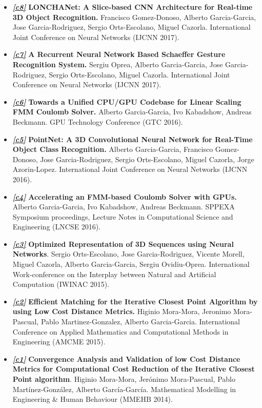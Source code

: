 \documentclass[8pt]{article}
\begin{document}
\begin{itemize}
    \item \emph{\textbf{\href{http://ieeexplore.ieee.org/abstract/document/7965883/}{[c8]}}} \textbf{LONCHANet: A Slice-based CNN Architecture for Real-time 3D Object Recognition.} Francisco Gomez-Donoso, Alberto Garcia-Garcia, Jose Garcia-Rodriguez, Sergio Orts-Escolano, Miguel Cazorla. International Joint Conference on Neural Networks (IJCNN 2017).
    \item \emph{\textbf{\href{http://ieeexplore.ieee.org/abstract/document/7965885/}{[c7]}}} \textbf{A Recurrent Neural Network Based Schaeffer Gesture Recognition System.} Sergiu Oprea, Alberto Garcia-Garcia, Jose Garcia-Rodriguez, Sergio Orts-Escolano, Miguel Cazorla. International Joint Conference on Neural Networks (IJCNN 2017).
    \item \emph{\textbf{\href{http://on-demand.gputechconf.com/gtc/2016/presentation/s6286-albert-garcia-towards-a-unified-cpu-gpu-codebase.pdf}{[c6]}}} \textbf{Towards a Unified CPU/GPU Codebase for Linear Scaling FMM Coulomb Solver.} Alberto Garcia-Garcia, Ivo Kabadshow, Andreas Beckmann. GPU Technology Conference (GTC 2016).
    \item \emph{\textbf{\href{http://ieeexplore.ieee.org/document/7727386/}{[c5]}}} \textbf{PointNet: A 3D Convolutional Neural Network for Real-Time Object Class Recognition.} Alberto Garcia-Garcia, Francisco Gomez-Donoso, Jose Garcia-Rodriguez, Sergio Orts-Escolano, Miguel Cazorla, Jorge Azorin-Lopez. International Joint Conference on Neural Networks (IJCNN 2016).
    \item \emph{\textbf{\href{http://link.springer.com/chapter/10.1007/978-3-319-40528-5_22}{[c4]}}} \textbf{Accelerating an FMM-based Coulomb Solver with GPUs.} Alberto Garcia-Garcia, Ivo Kabadshow, Andreas Beckmann. SPPEXA Symposium proceedings, Lecture Notes in Computational Science and Engineering (LNCSE 2016).
    \item \emph{\textbf{\href{http://link.springer.com/chapter/10.1007/978-3-319-18833-1_27}{[c3]}}} \textbf{Optimized Representation of 3D Sequences using Neural Networks}. Sergio Orts-Escolano, Jose Garcia-Rodriguez, Vicente Morell, Miguel Cazorla, Alberto Garcia-Garcia, Sergiu Ovidiu-Oprea. International Work-conference on the Interplay between Natural and Artificial Computation (IWINAC 2015).
    \item \emph{\textbf{\href{http://www.inase.org/library/2015/barcelona/bypaper/AMCME/AMCME-06.pdf}{[c2]}}} \textbf{Efficient Matching for the Iterative Closest Point Algorithm by using Low Cost Distance Metrics.} Higinio Mora-Mora, Jeronimo Mora-Pascual, Pablo Martinez-Gonzalez, Alberto Garcia-Garcia. International Conference on Applied Mathematics and Computational Methods in Engineering (AMCME 2015).
    \item \emph{\textbf{\href{http://jornadas.imm.upv.es/Modelling2014}{[c1]}}} \textbf{Convergence Analysis and Validation of low Cost Distance Metrics for Computational Cost Reduction of the Iterative Closest Point algorithm}. Higinio Mora-Mora, Jerónimo Mora-Pascual, Pablo Martínez-González, Alberto García-García. Mathematical Modelling in Engineering \& Human Behaviour (MMEHB 2014).\\
\end{itemize}
\end{document}
